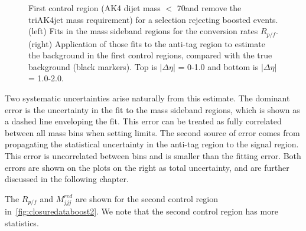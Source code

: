 \begin{figure}[h]
\caption{First control region (AK4 dijet mass $<$ 70\GeV and remove the triAK4jet mass requirement) for a selection rejecting boosted events. (left) Fits in the mass sideband regions for the conversion rates $R_{p/f}$. (right) Application of those fits to the anti-tag region to estimate the background in the first control regions, compared with the true background (black markers). Top is $|\Delta\eta|$ = 0-1.0 and bottom is $|\Delta\eta|$ = 1.0-2.0.}
\label{fig:closuredataboost}
\end{figure}

Two systematic uncertainties arise naturally from this estimate. The dominant error is the uncertainty in the fit to the mass sideband regions, which is shown as a dashed line enveloping the fit. This error can be treated as fully correlated between all mass bins when setting limits. The second source of error comes from propagating the statistical uncertainty in the anti-tag region to the signal region. This error is uncorrelated between bins and is smaller than the fitting error. Both errors are shown on the plots on the right as total uncertainty, and are further discussed in the following chapter.

The $R_{p/f}$ and $M_{jjj}^{red}$ are shown for the second control region in~\ref{fig:closuredataboost2}. We note that the second control region has more statistics.

